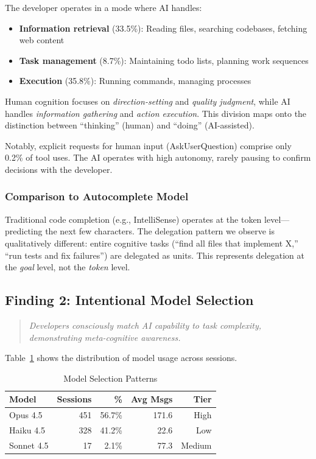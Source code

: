 \documentclass{ntlabs-preprint}
\begin{document}
The developer operates in a mode where AI handles:
\begin{itemize}
    \item \textbf{Information retrieval} (33.5\%): Reading files, searching codebases, fetching web content
    \item \textbf{Task management} (8.7\%): Maintaining todo lists, planning work sequences
    \item \textbf{Execution} (35.8\%): Running commands, managing processes
\end{itemize}

Human cognition focuses on \textit{direction-setting} and \textit{quality judgment}, while AI handles \textit{information gathering} and \textit{action execution}. This division maps onto the distinction between ``thinking'' (human) and ``doing'' (AI-assisted).

Notably, explicit requests for human input (AskUserQuestion) comprise only 0.2\% of tool uses. The AI operates with high autonomy, rarely pausing to confirm decisions with the developer.

\subsubsection{Comparison to Autocomplete Model}

Traditional code completion (e.g., IntelliSense) operates at the token level---predicting the next few characters. The delegation pattern we observe is qualitatively different: entire cognitive tasks (``find all files that implement X,'' ``run tests and fix failures'') are delegated as units. This represents delegation at the \textit{goal} level, not the \textit{token} level.

\subsection{Finding 2: Intentional Model Selection}

\begin{quote}
\textit{Developers consciously match AI capability to task complexity, demonstrating meta-cognitive awareness.}
\end{quote}

Table~\ref{tab:models} shows the distribution of model usage across sessions.

\begin{table}[h]
\centering
\caption{Model Selection Patterns}
\label{tab:models}
\begin{tabular}{lrrrr}
\toprule
\textbf{Model} & \textbf{Sessions} & \textbf{\%} & \textbf{Avg Msgs} & \textbf{Tier} \\
\midrule
Opus 4.5 & 451 & 56.7\% & 171.6 & High \\
Haiku 4.5 & 328 & 41.2\% & 22.6 & Low \\
Sonnet 4.5 & 17 & 2.1\% & 77.3 & Medium \\
\bottomrule
\end{tabular}
\end{table}
\end{document}
